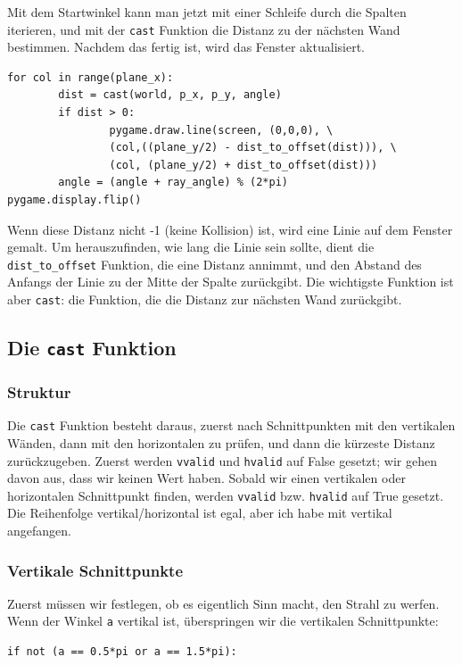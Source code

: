 \documentclass[a4paper,12pt]{report}
\begin{document}
Mit dem Startwinkel kann man jetzt mit einer Schleife durch die Spalten iterieren, und mit der \texttt{cast} Funktion die Distanz zu der nächsten Wand bestimmen. Nachdem das fertig ist, wird das Fenster aktualisiert.
\begin{Verbatim}[baselinestretch=1.0, xleftmargin=1cm]
for col in range(plane_x):
        dist = cast(world, p_x, p_y, angle)
        if dist > 0:
                pygame.draw.line(screen, (0,0,0), \
                (col,((plane_y/2) - dist_to_offset(dist))), \
                (col, (plane_y/2) + dist_to_offset(dist)))
        angle = (angle + ray_angle) % (2*pi)
pygame.display.flip()
\end{Verbatim}
Wenn diese Distanz nicht -1 (keine Kollision) ist, wird eine Linie auf dem Fenster gemalt. Um herauszufinden, wie lang die Linie sein sollte, dient die \texttt{dist\_to\_offset} Funktion, die eine Distanz annimmt, und den Abstand des Anfangs der Linie zu der Mitte der Spalte zurückgibt. Die wichtigste Funktion ist aber \texttt{cast}: die Funktion, die die Distanz zur nächsten Wand zurückgibt.

\subsection{Die \texttt{cast} Funktion}
\subsubsection{Struktur}
Die \texttt{cast} Funktion besteht daraus, zuerst nach Schnittpunkten mit den vertikalen Wänden, dann mit den horizontalen zu prüfen, und dann die kürzeste Distanz zurückzugeben. Zuerst werden \texttt{vvalid} und \texttt{hvalid} auf False gesetzt; wir gehen davon aus, dass wir keinen Wert haben. Sobald wir einen vertikalen oder horizontalen Schnittpunkt finden, werden \texttt{vvalid} bzw. \texttt{hvalid} auf True gesetzt. \\
Die Reihenfolge vertikal/horizontal ist egal, aber ich habe mit vertikal angefangen.
\subsubsection{Vertikale Schnittpunkte}
Zuerst müssen wir festlegen, ob es eigentlich Sinn macht, den Strahl zu werfen. Wenn der Winkel \texttt{a} vertikal ist, überspringen wir die vertikalen Schnittpunkte:
\begin{Verbatim}[baselinestretch=1.0, xleftmargin=1cm]
if not (a == 0.5*pi or a == 1.5*pi):
\end{Verbatim}
\end{document}
